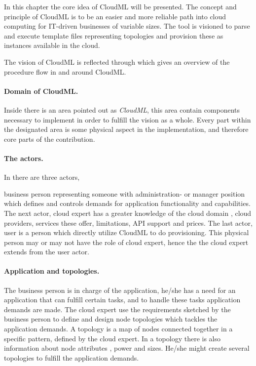 

In this chapter the core idea of CloudML will be presented.
The concept and principle of CloudML is to be an easier and more reliable
path into cloud computing for IT-driven businesses of variable sizes.
The tool is visioned to parse and execute template files representing topologies
and provision these as instances available in the cloud. 

The vision of CloudML is reflected through  which gives
an overview of the procedure flow in and around CloudML.

\paragraph{Domain of CloudML.}

Inside  there is an area pointed out as \emph{CloudML},
this area contain components necessary to implement in order to fulfill
the vision as a whole.
Every part within the designated area is some physical aspect in the 
implementation, and therefore core parts of the contribution.

\paragraph{The actors.}

In  there are three actors,
\begin{ii}
  \iitem business person representing someone with administration- or manager position which
    defines and controls demands for application functionality and capabilities.
    The next actor,
  \iitem cloud expert has a greater knowledge of the cloud domain \eg, cloud providers,
    services these offer, limitations, API support and prices.
    The last actor,
  \iitem user is a person which directly utilize CloudML to do provisioning.
    This physical person may or may not have the role of cloud expert, 
    hence the the cloud expert extends from the user actor.
\end{ii}

\paragraph{Application and topologies.}

The business person is in charge of the application, he/she has a need
for an application that can fulfill certain tasks, and to handle these 
tasks application demands are made.
The cloud expert use the requirements sketched by the business person to 
define and design node topologies which tackles the application demands.
A topology is a map of nodes connected together in a specific pattern, 
defined by the cloud expert.
In a topology there is also information about node attributes 
\eg,  power and  sizes.
He/she might create several topologies to fulfill the application demands.

